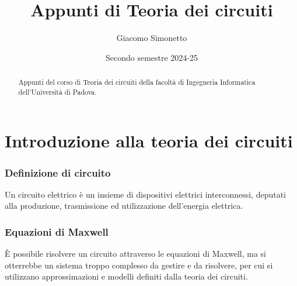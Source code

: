 \documentclass[a4paper]{article}
\title{Appunti di Teoria dei circuiti}
\author{Giacomo Simonetto}
\date{Secondo semestre 2024-25}
\newcommand\nab{\vec{\nabla}} %
\begin{document}
\maketitle
\begin{abstract}
	Appunti del corso di Teoria dei circuiti della facoltà di Ingegneria Informatica dell'Università di Padova.
\end{abstract}

\newpage

\tableofcontents

\newpage

\section{Introduzione alla teoria dei circuiti}
\subsubsection*{Definizione di circuito}
Un circuito elettrico è un insieme di dispositivi elettrici interconnessi, deputati alla produzione, trasmissione ed utilizzazione
dell'energia elettrica.

\subsubsection*{Equazioni di Maxwell}
È possibile risolvere un circuito attraverso le equazioni di Maxwell, ma si otterrebbe un sistema troppo complesso da gestire e da
risolvere, per cui si utilizzano approssimazioni e modelli definiti dalla teoria dei circuiti.

\end{document}
